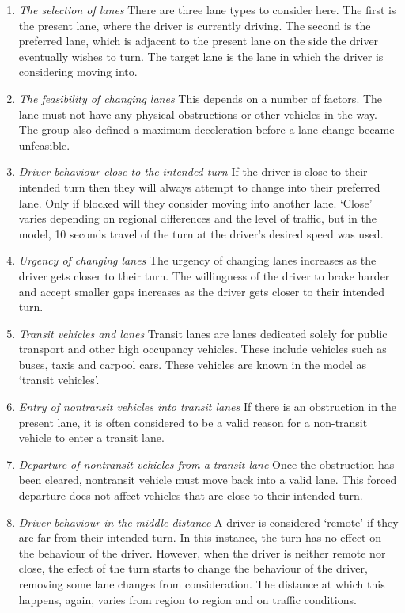 \begin{enumerate}
\item \textit{The selection of lanes}
There are three lane types to consider here. The first is the present lane, where the driver is currently driving. The second is the preferred lane, which is adjacent to the present lane on the side the driver eventually wishes to turn. The target lane is the lane in which the driver is considering moving into.


\item \textit{The feasibility of changing lanes} 
This depends on a number of factors. The lane must not have any physical obstructions or other vehicles in the way. The group also defined a maximum deceleration before a lane change became unfeasible.


\item \textit{Driver behaviour close to the intended turn}
If the driver is close to their intended turn then they will always attempt to change into their preferred lane. Only if blocked will they consider moving into another lane. `Close' varies depending on regional differences and the level of traffic, but in the model, 10 seconds travel of the turn at the driver's desired speed was used.
\item \textit{Urgency of changing lanes}
The urgency of changing lanes increases as the driver gets closer to their turn. The willingness of the driver to brake harder and accept smaller gaps increases as the driver gets closer to their intended turn.


\item \textit{Transit vehicles and lanes}
Transit lanes are lanes dedicated solely for public transport and other high occupancy vehicles. These include vehicles such as buses, taxis and carpool cars. These vehicles are known in the model as `transit vehicles'.
\item \textit{Entry of nontransit vehicles into transit lanes}
If there is an obstruction in the present lane, it is often considered to be a valid reason for a non-transit vehicle to enter a transit lane. 
\item \textit{Departure of nontransit vehicles from a transit lane}
Once the obstruction has been cleared, nontransit vehicle must move back into a valid lane. This forced departure does not affect vehicles that are close to their intended turn.
\item \textit{Driver behaviour in the middle distance} 
A driver is considered `remote' if they are far from their intended turn. In this instance, the turn has no effect on the behaviour of the driver. However, when the driver is neither remote nor close, the effect of the turn starts to change the behaviour of the driver, removing some lane changes from consideration. The distance at which this happens, again, varies from region to region and on traffic conditions. 


\end{enumerate}
